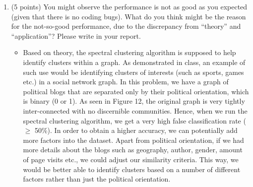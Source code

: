\documentclass[twoside,10pt]{article}
\begin{document}
\begin{enumerate}
\begin{enumerate}
\item (5 points) You might observe the performance is not as good as you expected (given that there is no coding bugs). What do you think might be the reason for the not-so-good performance, due to the discrepancy from ``theory'' and ``application''? Please write in your report. 
\begin{itemize}
\item Based on theory, the spectral clustering algorithm is supposed to help identify clusters within a graph. As demonstrated in class, an example of such use would be identifying clusters of interests (such as sports, games etc.) in a social network graph.
In this problem, we have a graph of political blogs that are separated only by their political orientation, which is binary (0 or 1). As seen in Figure 12, the original graph is very tightly inter-connected with no discernible communities. Hence, when we run the spectral clustering algorithm, we get a very high false classification rate ($\geq$ 50\%).
In order to obtain a higher accuracy, we can potentially add more factors into the dataset. Apart from political orientation, if we had more details about the blogs such as geography, author, gender, amount of page visits etc., we could adjust our similarity criteria. This way, we would be better able to identify clusters based on a number of different factors rather than just the political orientation.

\end{itemize}
\end{enumerate}

\end{enumerate}
\end{document}
